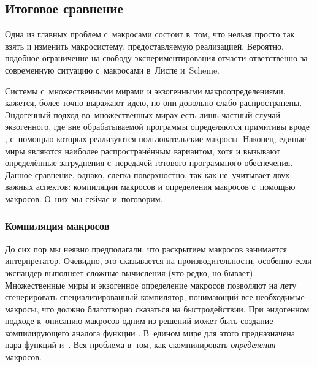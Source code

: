 \subsection{Итоговое сравнение}\label{macros/define/ssect:comparison}

Одна из главных проблем с~макросами состоит в~том, что нельзя просто так взять
и изменить макросистему, предоставляемую реализацией. Вероятно, подобное
ограничение на свободу экспериментирования отчасти ответственно за современную
ситуацию с~макросами в~Лиспе и~Scheme.

Системы с~множественными мирами и экзогенными макроопределениями, кажется, более
точно выражают идею, но они довольно слабо распространены. Эндогенный подход
во~множественных мирах есть лишь частный случай экзогенного, где вне
обрабатываемой программы определяются примитивы вроде 
{\itd}, с~помощью которых реализуются пользовательские макросы. Наконец, единые
миры являются наиболее распространённым вариантом, хотя и вызывают определённые
затруднения с~передачей готового программного обеспечения. Данное сравнение,
однако, слегка поверхностно, так как не~учитывает двух важных аспектов:
компиляции макросов и определения макросов с~помощью макросов. О~них мы сейчас
и~поговорим.


\subsubsection{Компиляция макросов}%
\label{macros/define/comparison/sssect:compiling}

До сих пор мы неявно предполагали, что раскрытием макросов занимается
интерпретатор. Очевидно, это сказывается на производительности, особенно если
экспандер выполняет сложные вычисления (что редко, но бывает). Множественные
миры и экзогенное определение макросов 
позволяют на лету сгенерировать специализированный компилятор, понимающий все 
необходимые макросы, что должно благотворно сказаться на быстродействии. При
эндогенном подходе к~описанию макросов одним из решений может быть создание
компилирующего аналога функции . В~едином мире для этого
предназначена пара функций  и~. Вся проблема в~том,
как скомпилировать \emph{определения} макросов.

